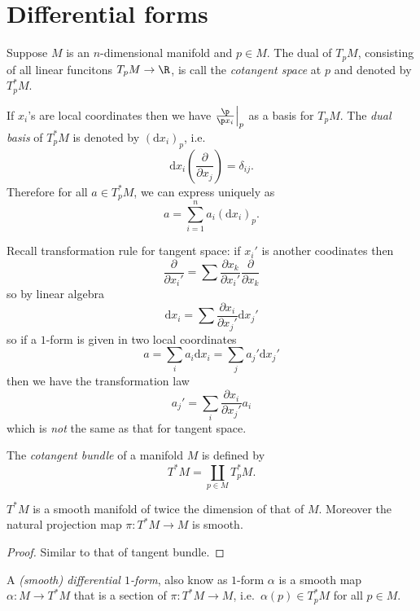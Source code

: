 \documentclass[a4paper]{article}
\begin{document}
\section{Differential forms}

\begin{definition}
  Suppose \(M\) is an \(n\)-dimensional manifold and \(p \in M\). The dual of \(T_pM\), consisting of all linear funcitons \(T_pM \to \R\), is call the \emph{cotangent space} at \(p\) and denoted by \(T_p^*M\).
\end{definition}
If \(x_i\)'s are local coordinates then we have \(\frac{\p}{\p x_i}\Big|_p\) as a basis for \(T_pM\). The \emph{dual basis} of \(T_p^*M\) is denoted by \((\mathrm d x_i)_p\), i.e.
\[
  \mathrm dx_i(\frac{\partial  }{\partial x_j}) = \delta_{ij}.
\]
Therefore for all \(a \in T_p^*M\), we can express uniquely as
\[
  a = \sum_{i = 1}^n a_i (\mathrm dx_i)_p.
\]

Recall transformation rule for tangent space: if \(x_i'\) is another coodinates then
\[
  \frac{\partial  }{\partial x_i'} = \sum \frac{\partial x_k}{\partial x_i'} \frac{\partial  }{\partial x_k}
\]
so by linear algebra
\[
  \mathrm dx_i = \sum \frac{\partial x_i}{\partial x_j'} \mathrm d x_j'
\]
so if a \(1\)-form is given in two local coordinates
\[
  a = \sum_i a_i \mathrm dx_i = \sum_j a_j' \mathrm dx_j'
\]
then we have the transformation law
\[
  a_j' = \sum_i \frac{\partial x_i}{\partial x_j'} a_i
\]
which is \emph{not} the same as that for tangent space.

\begin{definition}
  The \emph{cotangent bundle} of a manifold \(M\) is defined by
  \[
    T^*M = \coprod_{p \in M} T^*_pM.
  \]
\end{definition}

\begin{theorem}
  \(T^*M\) is a smooth manifold of twice the dimension of that of \(M\). Moreover the natural projection map \(\pi: T^*M \to M\) is smooth.
\end{theorem}

\begin{proof}
  Similar to that of tangent bundle.
\end{proof}

\begin{definition}
  A \emph{(smooth) differential \(1\)-form}, also know as \(1\)-form \(\alpha\) is a smooth map \(\alpha: M \to T^*M\) that is a section of \(\pi: T^*M \to M\), i.e.\ \(\alpha(p) \in T_p^*M\) for all \(p \in M\).
\end{definition}
\end{document}

